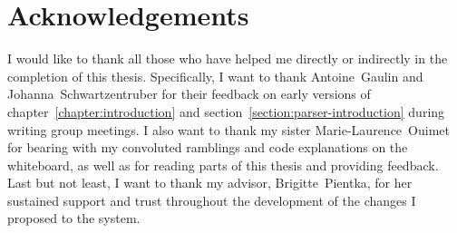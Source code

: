 \chapter*{Acknowledgements}

I would like to thank all those who have helped me directly or indirectly in the completion of this thesis.
Specifically, I want to thank Antoine~Gaulin and Johanna~Schwartzentruber for their feedback on early versions of chapter~\ref{chapter:introduction} and section~\ref{section:parser-introduction} during writing group meetings.
I also want to thank my sister Marie-Laurence~Ouimet for bearing with my convoluted ramblings and code explanations on the whiteboard, as well as for reading parts of this thesis and providing feedback.
Last but not least, I want to thank my advisor, Brigitte~Pientka, for her sustained support and trust throughout the development of the changes I proposed to the \Beluga system.


